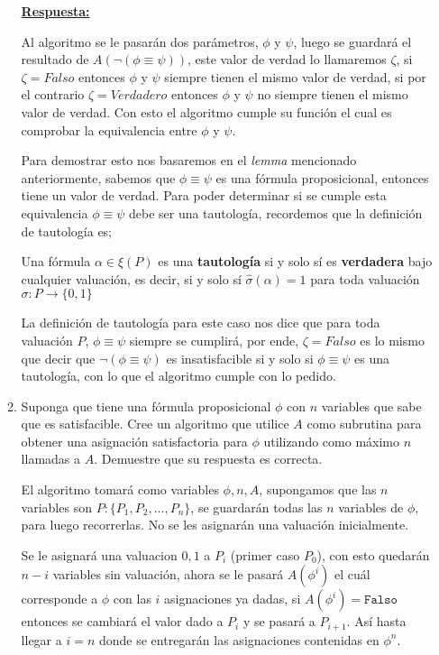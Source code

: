 \documentclass[10pt]{article}
\begin{document}
\begin{enumerate}
\begin{enumerate}
        \textbf{\underline{Respuesta:}}

        Al algoritmo se le pasarán dos parámetros, $\phi$ y $\psi$, luego se guardará el resultado de 
        $A(\neg(\phi\equiv\psi))$, este valor de verdad lo llamaremos $\zeta $, si $\zeta=Falso$  entonces 
        $\phi$ y $\psi$ siempre tienen el mismo valor de verdad, si por el contrario $\zeta=Verdadero$ 
        entonces $\phi$ y $\psi$ no siempre tienen el mismo valor de verdad. Con esto el algoritmo cumple su
        función el cual es comprobar la equivalencia entre $\phi$ y $\psi$.
        
        Para demostrar esto nos basaremos en el \textit{lemma} mencionado anteriormente, sabemos que 
        $\phi\equiv\psi$ es una fórmula proposicional, entonces tiene un valor de verdad. 
        \clearpage 
        Para poder determinar si se cumple esta equivalencia $\phi\equiv\psi$ debe ser una tautología, 
        recordemos que la definición de tautología es;

        \begin{tcolorbox}[title=\textit{Tautología}]
            Una fórmula $\alpha\in\xi(P)$ es una \textbf{tautología} si y solo sí es \textbf{verdadera} bajo
            cualquier valuación, es decir, si y solo sí $\widehat{\sigma}(\alpha)=1$ para toda valuación
            $\sigma:P\rightarrow \{0,1\}$  
        \end{tcolorbox}

        La definición de tautología para este caso nos dice que para toda valuación $P$, $\phi\equiv\psi$ 
        siempre se cumplirá, por ende, $\zeta=Falso$ es lo mismo que decir que $\neg(\phi\equiv\psi)$ es 
        insatisfacible si y solo si $\phi\equiv\psi$ es una tautología, con lo que el algoritmo cumple con
        lo pedido.
        \item Suponga que tiene una fórmula proposicional $\phi$ con $n$ variables que sabe que es satisfacible. 
        Cree un algoritmo que utilice $A$ como subrutina para obtener una asignación satisfactoria para $\phi$ 
        utilizando como máximo $n$  llamadas a $A$. Demuestre que su respuesta es correcta.

        El algoritmo tomará como variables $\phi , n , A$, supongamos que las $n$ variables son \newline 
        $P:\{P_1,P_2,...,P_n\}$, se guardarán todas las $n$ variables de $\phi$, para luego recorrerlas. No se 
        les asignarán una valuación inicialmente.
        
        Se le asignará una valuacion ${0,1}$ a $P_i$ (primer caso $P_0$), con esto quedarán $n-i$ variables sin 
        valuación, ahora se le pasará $A(\phi ^i)$ el cuál corresponde a $\phi$ con las $i$ asignaciones 
        ya dadas, si $A(\phi^i)=\texttt{Falso}$ entonces se cambiará el valor dado a $P_i$ y se pasará a $P_{i+1}$.
        Así hasta llegar a $i=n$ donde se entregarán las asignaciones contenidas en $\phi^n$. 


\end{enumerate}
\end{enumerate}
\end{document}
